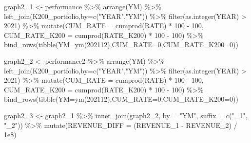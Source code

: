 \documentclass[
  a4paper,
  DIV=11,
  numbers=noendperiod]{scrreprt}
\newenvironment{Shaded}{\begin{snugshade}}{\end{snugshade}}
\newcommand{\AttributeTok}[1]{\textcolor[rgb]{0.40,0.45,0.13}{#1}}
\newcommand{\DecValTok}[1]{\textcolor[rgb]{0.68,0.00,0.00}{#1}}
\newcommand{\FloatTok}[1]{\textcolor[rgb]{0.68,0.00,0.00}{#1}}
\newcommand{\FunctionTok}[1]{\textcolor[rgb]{0.28,0.35,0.67}{#1}}
\newcommand{\NormalTok}[1]{\textcolor[rgb]{0.00,0.23,0.31}{#1}}
\newcommand{\OtherTok}[1]{\textcolor[rgb]{0.00,0.23,0.31}{#1}}
\newcommand{\SpecialCharTok}[1]{\textcolor[rgb]{0.37,0.37,0.37}{#1}}
\newcommand{\StringTok}[1]{\textcolor[rgb]{0.13,0.47,0.30}{#1}}
\begin{document}
\begin{Shaded}
\begin{Highlighting}[]
\NormalTok{graph2\_1 }\OtherTok{\textless{}{-}}\NormalTok{ performance }\SpecialCharTok{\%\textgreater{}\%}
  \FunctionTok{arrange}\NormalTok{(YM) }\SpecialCharTok{\%\textgreater{}\%}
  \FunctionTok{left\_join}\NormalTok{(K200\_portfolio,}\AttributeTok{by=}\FunctionTok{c}\NormalTok{(}\StringTok{"YEAR"}\NormalTok{,}\StringTok{"YM"}\NormalTok{)) }\SpecialCharTok{\%\textgreater{}\%} 
  \FunctionTok{filter}\NormalTok{(}\FunctionTok{as.integer}\NormalTok{(YEAR) }\SpecialCharTok{\textgreater{}} \DecValTok{2021}\NormalTok{) }\SpecialCharTok{\%\textgreater{}\%}
  \FunctionTok{mutate}\NormalTok{(}\AttributeTok{CUM\_RATE =} \FunctionTok{cumprod}\NormalTok{(RATE) }\SpecialCharTok{*} \DecValTok{100} \SpecialCharTok{{-}} \DecValTok{100}\NormalTok{,}
         \AttributeTok{CUM\_RATE\_K200 =} \FunctionTok{cumprod}\NormalTok{(RATE\_K200) }\SpecialCharTok{*} \DecValTok{100} \SpecialCharTok{{-}} \DecValTok{100}\NormalTok{) }\SpecialCharTok{\%\textgreater{}\%} 
  \FunctionTok{bind\_rows}\NormalTok{(}\FunctionTok{tibble}\NormalTok{(}\AttributeTok{YM=}\FunctionTok{ym}\NormalTok{(}\DecValTok{202112}\NormalTok{),}\AttributeTok{CUM\_RATE=}\DecValTok{0}\NormalTok{,}\AttributeTok{CUM\_RATE\_K200=}\DecValTok{0}\NormalTok{))}

\NormalTok{graph2\_2 }\OtherTok{\textless{}{-}}\NormalTok{ performance2 }\SpecialCharTok{\%\textgreater{}\%}
  \FunctionTok{arrange}\NormalTok{(YM) }\SpecialCharTok{\%\textgreater{}\%}
  \FunctionTok{left\_join}\NormalTok{(K200\_portfolio,}\AttributeTok{by=}\FunctionTok{c}\NormalTok{(}\StringTok{"YEAR"}\NormalTok{,}\StringTok{"YM"}\NormalTok{)) }\SpecialCharTok{\%\textgreater{}\%} 
  \FunctionTok{filter}\NormalTok{(}\FunctionTok{as.integer}\NormalTok{(YEAR) }\SpecialCharTok{\textgreater{}} \DecValTok{2021}\NormalTok{) }\SpecialCharTok{\%\textgreater{}\%}
  \FunctionTok{mutate}\NormalTok{(}\AttributeTok{CUM\_RATE =} \FunctionTok{cumprod}\NormalTok{(RATE) }\SpecialCharTok{*} \DecValTok{100} \SpecialCharTok{{-}} \DecValTok{100}\NormalTok{,}
         \AttributeTok{CUM\_RATE\_K200 =} \FunctionTok{cumprod}\NormalTok{(RATE\_K200) }\SpecialCharTok{*} \DecValTok{100} \SpecialCharTok{{-}} \DecValTok{100}\NormalTok{) }\SpecialCharTok{\%\textgreater{}\%} 
  \FunctionTok{bind\_rows}\NormalTok{(}\FunctionTok{tibble}\NormalTok{(}\AttributeTok{YM=}\FunctionTok{ym}\NormalTok{(}\DecValTok{202112}\NormalTok{),}\AttributeTok{CUM\_RATE=}\DecValTok{0}\NormalTok{,}\AttributeTok{CUM\_RATE\_K200=}\DecValTok{0}\NormalTok{))}

\NormalTok{graph2\_3 }\OtherTok{\textless{}{-}}\NormalTok{ graph2\_1 }\SpecialCharTok{\%\textgreater{}\%}
  \FunctionTok{inner\_join}\NormalTok{(graph2\_2, }\AttributeTok{by =} \StringTok{"YM"}\NormalTok{, }\AttributeTok{suffix =} \FunctionTok{c}\NormalTok{(}\StringTok{"\_1"}\NormalTok{, }\StringTok{"\_2"}\NormalTok{)) }\SpecialCharTok{\%\textgreater{}\%}
  \FunctionTok{mutate}\NormalTok{(}\AttributeTok{REVENUE\_DIFF =}\NormalTok{ (REVENUE\_1 }\SpecialCharTok{{-}}\NormalTok{ REVENUE\_2) }\SpecialCharTok{/} \FloatTok{1e8}\NormalTok{)}


\end{Highlighting}
\end{Shaded}
\end{document}
